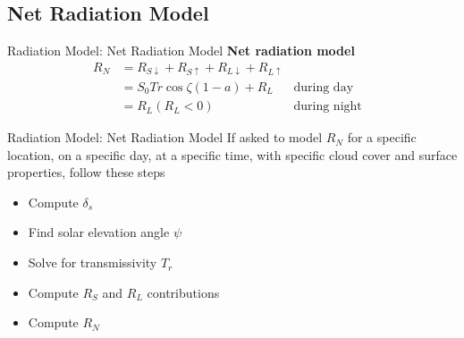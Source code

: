 \subsection{Net Radiation Model}
\begin{frame}{Radiation Model: Net Radiation Model}
\textbf{Net radiation model}
\begin{align*}
	R_N &= R_{S\downarrow} + R_{S\uparrow} + R_{L\downarrow} + R_{L\uparrow}\\
	&= S_0Tr\cos\zeta(1-a) + R_L &\text{during day}&\\
	&= R_L (R_L<0) &\text{during night}&
\end{align*}
\end{frame}
\begin{frame}{Radiation Model: Net Radiation Model}
If asked to model $R_N$ for a specific location, on a specific day, at a specific time, with specific cloud cover and surface properties, follow these steps
\begin{itemize}
	\item Compute $\delta_s$
	\item Find solar elevation angle $\psi$
	\item Solve for transmissivity $T_r$
	\item Compute $R_S$ and $R_L$ contributions
	\item Compute $R_N$
\end{itemize}
\end{frame}



